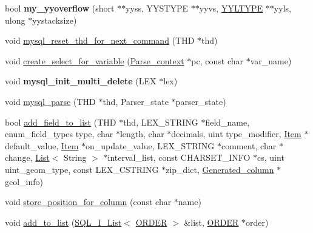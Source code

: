 \begin{DoxyCompactItemize}
\mbox{\label{group__Runtime__Environment_ga575f30fef70f57d45123b418f7a14efa}} 
bool {\bfseries my\+\_\+yyoverflow} (short $\ast$$\ast$yyss, Y\+Y\+S\+T\+Y\+PE $\ast$$\ast$yyvs, \mbox{\hyperlink{structYYLTYPE}{Y\+Y\+L\+T\+Y\+PE}} $\ast$$\ast$yyls, ulong $\ast$yystacksize)
\item 
void \mbox{\hyperlink{group__Runtime__Environment_gab37db6950d3b6bc16bbbb2ae0484ae55}{mysql\+\_\+reset\+\_\+thd\+\_\+for\+\_\+next\+\_\+command}} (T\+HD $\ast$thd)
\item 
void \mbox{\hyperlink{group__Runtime__Environment_gae69775e9e669f55cbedb293c4498717b}{create\+\_\+select\+\_\+for\+\_\+variable}} (\mbox{\hyperlink{structParse__context}{Parse\+\_\+context}} $\ast$pc, const char $\ast$var\+\_\+name)
\item 
\mbox{\label{group__Runtime__Environment_ga891266e258a6034e8f09a410bb4abe62}} 
void {\bfseries mysql\+\_\+init\+\_\+multi\+\_\+delete} (L\+EX $\ast$lex)
\item 
void \mbox{\hyperlink{group__Runtime__Environment_ga81611063376e9fd7612c3ca78d16f70d}{mysql\+\_\+parse}} (T\+HD $\ast$thd, Parser\+\_\+state $\ast$parser\+\_\+state)
\item 
bool \mbox{\hyperlink{group__Runtime__Environment_ga20dc4d55537ca52787813134e3639148}{add\+\_\+field\+\_\+to\+\_\+list}} (T\+HD $\ast$thd, L\+E\+X\+\_\+\+S\+T\+R\+I\+NG $\ast$field\+\_\+name, enum\+\_\+field\+\_\+types type, char $\ast$length, char $\ast$decimals, uint type\+\_\+modifier, \mbox{\hyperlink{classItem}{Item}} $\ast$default\+\_\+value, \mbox{\hyperlink{classItem}{Item}} $\ast$on\+\_\+update\+\_\+value, L\+E\+X\+\_\+\+S\+T\+R\+I\+NG $\ast$comment, char $\ast$change, \mbox{\hyperlink{classList}{List}}$<$ String $>$ $\ast$interval\+\_\+list, const C\+H\+A\+R\+S\+E\+T\+\_\+\+I\+N\+FO $\ast$cs, uint uint\+\_\+geom\+\_\+type, const L\+E\+X\+\_\+\+C\+S\+T\+R\+I\+NG $\ast$zip\+\_\+dict, \mbox{\hyperlink{classGenerated__column}{Generated\+\_\+column}} $\ast$gcol\+\_\+info)
\item 
void \mbox{\hyperlink{group__Runtime__Environment_ga22aec956c23a6f1e16aef7d9db67bc79}{store\+\_\+position\+\_\+for\+\_\+column}} (const char $\ast$name)
\item 
void \mbox{\hyperlink{group__Runtime__Environment_ga1d8a136c5775459ea3a35a0c27fc6c06}{add\+\_\+to\+\_\+list}} (\mbox{\hyperlink{classSQL__I__List}{S\+Q\+L\+\_\+\+I\+\_\+\+List}}$<$ \mbox{\hyperlink{structst__order}{O\+R\+D\+ER}} $>$ \&list, \mbox{\hyperlink{structst__order}{O\+R\+D\+ER}} $\ast$order)
$$
\end{DoxyCompactItemize}
